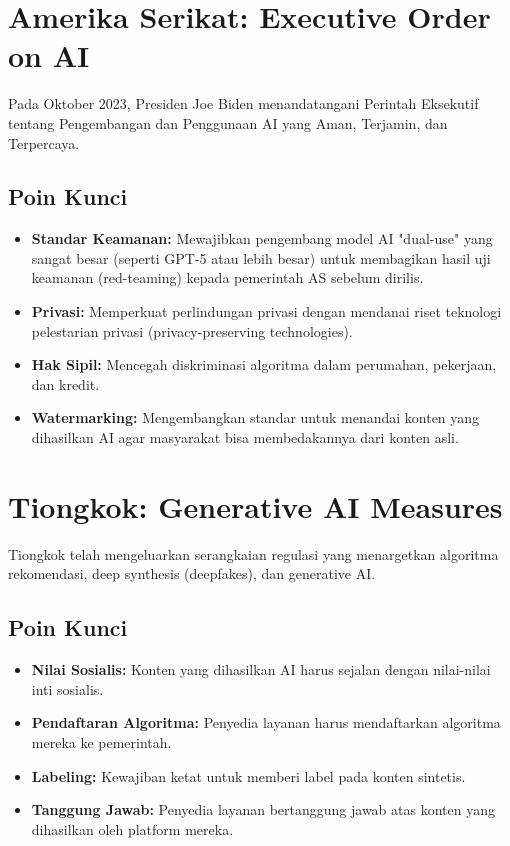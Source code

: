 \section{Amerika Serikat: Executive Order on AI}
Pada Oktober 2023, Presiden Joe Biden menandatangani Perintah Eksekutif tentang Pengembangan dan Penggunaan AI yang Aman, Terjamin, dan Terpercaya.

\subsection{Poin Kunci}
\begin{itemize}
    \item \textbf{Standar Keamanan:} Mewajibkan pengembang model AI "dual-use" yang sangat besar (seperti GPT-5 atau lebih besar) untuk membagikan hasil uji keamanan (red-teaming) kepada pemerintah AS sebelum dirilis.
    \item \textbf{Privasi:} Memperkuat perlindungan privasi dengan mendanai riset teknologi pelestarian privasi (privacy-preserving technologies).
    \item \textbf{Hak Sipil:} Mencegah diskriminasi algoritma dalam perumahan, pekerjaan, dan kredit.
    \item \textbf{Watermarking:} Mengembangkan standar untuk menandai konten yang dihasilkan AI agar masyarakat bisa membedakannya dari konten asli.
\end{itemize}

\section{Tiongkok: Generative AI Measures}
Tiongkok telah mengeluarkan serangkaian regulasi yang menargetkan algoritma rekomendasi, deep synthesis (deepfakes), dan generative AI.

\subsection{Poin Kunci}
\begin{itemize}
    \item \textbf{Nilai Sosialis:} Konten yang dihasilkan AI harus sejalan dengan nilai-nilai inti sosialis.
    \item \textbf{Pendaftaran Algoritma:} Penyedia layanan harus mendaftarkan algoritma mereka ke pemerintah.
    \item \textbf{Labeling:} Kewajiban ketat untuk memberi label pada konten sintetis.
    \item \textbf{Tanggung Jawab:} Penyedia layanan bertanggung jawab atas konten yang dihasilkan oleh platform mereka.
\end{itemize}

